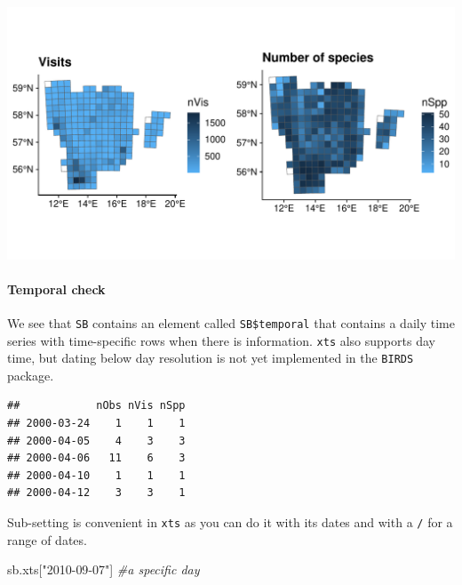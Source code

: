 \documentclass[
  10pt,
]{article}
\newenvironment{Shaded}{\begin{snugshade}}{\end{snugshade}}
\newcommand{\CommentTok}[1]{\textcolor[rgb]{0.56,0.35,0.01}{\textit{#1}}}
\newcommand{\DecValTok}[1]{\textcolor[rgb]{0.00,0.00,0.81}{#1}}
\newcommand{\FunctionTok}[1]{\textcolor[rgb]{0.00,0.00,0.00}{#1}}
\newcommand{\NormalTok}[1]{#1}
\newcommand{\OtherTok}[1]{\textcolor[rgb]{0.56,0.35,0.01}{#1}}
\newcommand{\SpecialCharTok}[1]{\textcolor[rgb]{0.00,0.00,0.00}{#1}}
\newcommand{\StringTok}[1]{\textcolor[rgb]{0.31,0.60,0.02}{#1}}
\begin{document}
\includegraphics{r-tools-tutorial_files/figure-latex/ggplot1-1.pdf}

\hypertarget{temporal-check}{%
\paragraph{Temporal check}\label{temporal-check}}

We see that \texttt{SB} contains an element called \texttt{SB\$temporal} that contains
a daily time series with time-specific rows when there is information.
\texttt{xts} also supports day time, but dating below day resolution is not yet
implemented in the \texttt{BIRDS} package.

\begin{Shaded}
\end{Shaded}

\begin{verbatim}
##            nObs nVis nSpp
## 2000-03-24    1    1    1
## 2000-04-05    4    3    3
## 2000-04-06   11    6    3
## 2000-04-10    1    1    1
## 2000-04-12    3    3    1
\end{verbatim}

Sub-setting is convenient in \texttt{xts} as you can do it with its dates and
with a \texttt{/} for a range of dates.

\begin{Shaded}
\begin{Highlighting}[]
\NormalTok{sb.xts[}\StringTok{"2010{-}09{-}07"}\NormalTok{] }\CommentTok{\#a specific day}
\end{Highlighting}
\end{Shaded}
\end{document}
